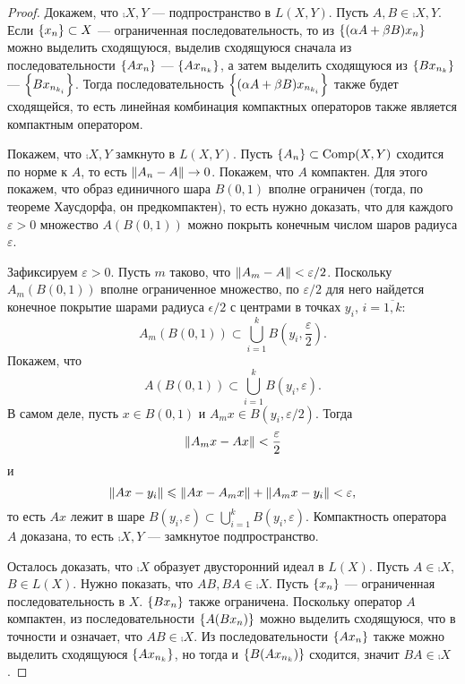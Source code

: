 \begin{proof}
    Докажем, что $\comp{X,Y}$ --- подпространство в $L(X, Y)$. Пусть $A, B \in \comp{X, Y}$. Если
    $\left\{x_n\right\} \subset X$ --- ограниченная последовательность, то из
    $\left\{(\alpha A + \beta B)x_n\right\}$ можно выделить сходящуюся,
    выделив сходящуюся сначала из последовательности $\left\{Ax_n\right\}$ --- $\left\{Ax_{n_k}\right\}$, а 
    затем выделить сходящуюся из $\left\{Bx_{n_k}\right\}$ --- $\left\{Bx_{n_{k_i}}\right\}$. Тогда 
    последовательность
    $\left\{(\alpha A + \beta B)x_{n_{k_i}}\right\}$ также будет сходящейся, то есть линейная комбинация
    компактных операторов также является компактным оператором.

    Покажем, что $\comp{X,Y}$ замкнуто в $L(X,Y)$. Пусть $\left\{A_n\right\} \subset \operatorname{Comp}({X, Y})$ сходится
    по норме к $A$, то есть $\left\|A_n - A\right\| \to 0$. Покажем, что $A$ компактен. Для этого покажем,
    что образ единичного шара $B(0,1)$ вполне ограничен (тогда, по теореме Хаусдорфа, он
    предкомпактен), то есть нужно доказать, что для каждого $\varepsilon > 0$ множество $A(B(0,1))$
    можно покрыть конечным числом шаров радиуса $\varepsilon$.

    Зафиксируем $\varepsilon > 0$. Пусть $m$ таково, что $\left\|A_m - A\right\| < \varepsilon/2$.
    Поскольку $A_m(B(0,1))$ вполне ограниченное множество, по $\varepsilon/2$ для него найдется 
    конечное покрытие шарами радиуса $\epsilon/2$ с центрами в точках $y_i$, $i = \overline{1,k}$:
    \[ A_m(B(0,1)) \subset \bigcup_{i=1}^k B(y_i, \frac{\varepsilon}{2}). \]
    Покажем, что 
    \[ A(B(0,1)) \subset \bigcup_{i=1}^k B(y_i, \varepsilon). \]
    В самом деле, пусть $x \in B(0, 1)$ и $A_mx \in B(y_i, \varepsilon/2)$. Тогда
    \[ \left\|A_mx - Ax\right\| < \frac{\varepsilon}{2} \]
    и
    \[ \left\|Ax - y_i\right\| \leqslant \left\|Ax - A_mx\right\| + \left\|A_mx - y_i\right\| < \varepsilon, \]
    то есть $Ax$ лежит в шаре $B(y_i, \varepsilon) \subset \bigcup_{i=1}^k B(y_i, \varepsilon)$.
    Компактность оператора $A$ доказана, то есть $\comp{X,Y}$ --- замкнутое подпространство.

    Осталось доказать, что $\comp{X}$ образует двусторонний идеал в $L(X)$. Пусть $A \in \comp{X}$,
    $B \in L(X)$. Нужно показать, что $AB, BA \in \comp{X}$. Пусть $\left\{x_n\right\}$ --- ограниченная
    последовательность в $X$. $\left\{Bx_n\right\}$ также ограничена. Поскольку оператор $A$ компактен,
    из последовательности $\left\{A(Bx_n)\right\}$ можно выделить сходящуюся, что в точности и означает,
    что $AB \in \comp{X}$. Из последовательности $\left\{Ax_n\right\}$ также можно выделить сходящуюся
    $\left\{Ax_{n_k}\right\}$, но тогда и $\left\{B(Ax_{n_k})\right\}$ сходится, значит $BA \in \comp{X}$.
\end{proof}

